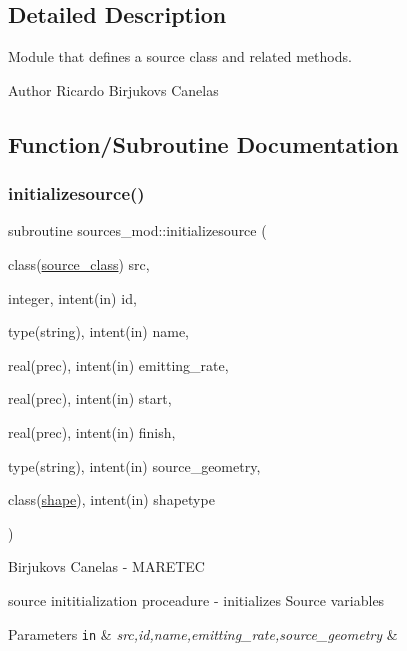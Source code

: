 \subsection{Detailed Description}
Module that defines a source class and related methods. 

\begin{DoxyAuthor}{Author}
Ricardo Birjukovs Canelas 
\end{DoxyAuthor}


\subsection{Function/\+Subroutine Documentation}
\mbox{\label{namespacesources__mod_a6dcf7a3e3ccf75e01853df166231d484}} 
\subsubsection{\texorpdfstring{initializesource()}{initializesource()}}
{\footnotesize\ttfamily subroutine sources\+\_\+mod\+::initializesource (\begin{DoxyParamCaption}\item[{class(\hyperlink{structsources__mod_1_1source__class}{source\+\_\+class})}]{src,  }\item[{integer, intent(in)}]{id,  }\item[{type(string), intent(in)}]{name,  }\item[{real(prec), intent(in)}]{emitting\+\_\+rate,  }\item[{real(prec), intent(in)}]{start,  }\item[{real(prec), intent(in)}]{finish,  }\item[{type(string), intent(in)}]{source\+\_\+geometry,  }\item[{class(\hyperlink{structgeometry__mod_1_1shape}{shape}), intent(in)}]{shapetype }\end{DoxyParamCaption})\hspace{0.3cm}{\ttfamily [private]}}



Birjukovs Canelas -\/ M\+A\+R\+E\+T\+EC 

source inititialization proceadure -\/ initializes Source variables 
\begin{DoxyParams}[1]{Parameters}
\mbox{\tt in}  & {\em src,id,name,emitting\+\_\+rate,source\+\_\+geometry} & \\
\hline
\end{DoxyParams}
\mbox{\label{namespacesources__mod_a6da3303e5c39d77c0111ec50623bf5fe}} 
